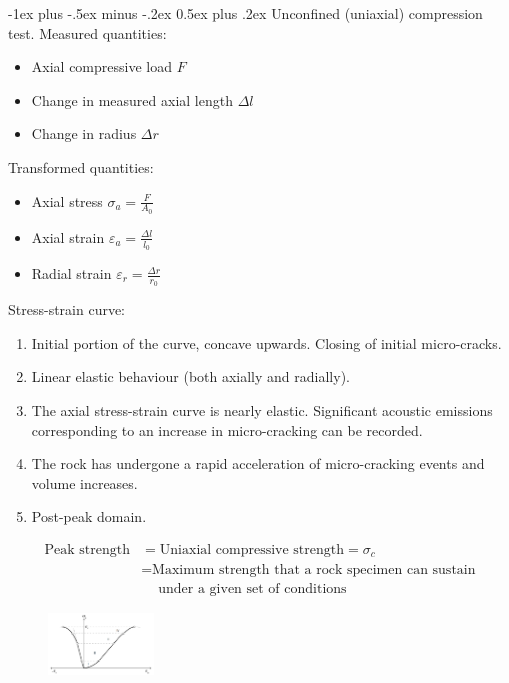 \documentclass[10pt,landscape,a4paper]{article}
\makeatletter
\renewcommand{\section}{\@startsection{section}{1}{0mm}%
	{-1ex plus -.5ex minus -.2ex}%
	{0.5ex plus .2ex}%
	{\normalfont\large\bfseries}}
\makeatother
\begin{document}
\begin{multicols}{3}
		\section{Unconfined (uniaxial) compression test.}
		Measured quantities:
			\begin{itemize}
				\item Axial compressive load $F$
				\item Change in measured axial length $\Delta l$
				\item Change in radius $\Delta r$
			\end{itemize}
		Transformed quantities:
			\begin{itemize}
				\item Axial stress $\sigma_a=\frac{F}{A_0}$
				\item Axial strain $\varepsilon_a=\frac{\Delta l}{l_0}$
				\item Radial strain $\varepsilon_r=\frac{\Delta r}{r_0}$
			\end{itemize}
		Stress-strain curve:
			\begin{enumerate}[label=\Roman*.]
				\item Initial portion of the curve, concave upwards. Closing of initial micro-cracks.
				\item Linear elastic behaviour (both axially and radially).
				\item The axial stress-strain curve is nearly elastic. Significant acoustic emissions corresponding to an increase in micro-cracking can be recorded.
				\item The rock has undergone a rapid acceleration of micro-cracking events and volume increases.
				\item Post-peak domain.
			\end{enumerate}
			\begin{align*}
				\text{Peak strength} &= \text{Uniaxial compressive strength} = \sigma_c\\
				&= \text{Maximum strength that a rock specimen can sustain}\\
				&\quad \ \text{under a given set of conditions}
			\end{align*}
			\begin{figure}[H]
				\centering
				\includegraphics[width=0.25\textwidth]{unconfined-uniaxial}

\end{figure}
\end{multicols}
\end{document}
